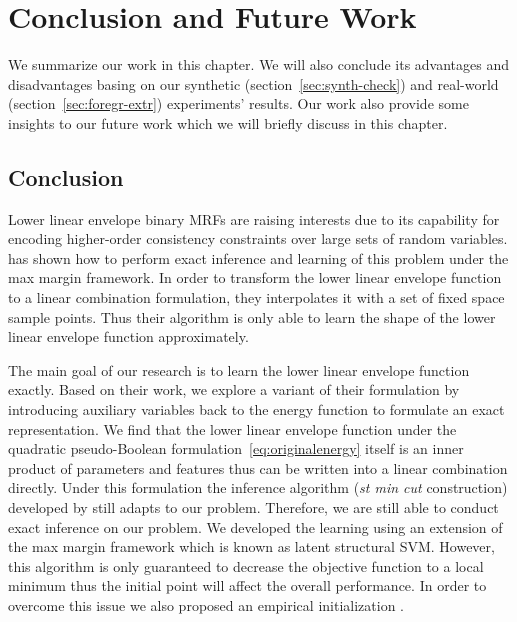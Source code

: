 
\chapter{Conclusion and Future Work}
\label{cha:conclusion}

We summarize our work in this chapter. We will also conclude its
advantages and disadvantages basing on our synthetic
(section~\ref{sec:synth-check}) and real-world
(section~\ref{sec:foregr-extr}) experiments' results. Our work
also provide some insights to our future work which we will
briefly discuss in this chapter.


\section{Conclusion}
\label{sec:conclusion}

Lower linear envelope binary MRFs are raising interests due to
its capability for encoding higher-order consistency constraints
over large sets of random variables.  has
shown how to perform exact inference and learning of this problem
under the max margin framework. In order to transform the lower
linear envelope function to a linear combination formulation,
they interpolates it with a set of fixed space sample points.
Thus their algorithm is only able to learn the shape of the lower
linear envelope function approximately.

The main goal of our research is to learn the lower linear
envelope function exactly. Based on their work, we explore a
variant of their formulation by introducing auxiliary variables
back to the energy function to formulate an exact representation.
We find that the lower linear envelope function under the
quadratic pseudo-Boolean formulation~\eqref{eq:originalenergy}
itself is an inner product of parameters and features thus can be
written into a linear combination directly. Under this
formulation the inference algorithm (\emph{st min cut}
construction) developed by  still adapts
to our problem. Therefore, we are still able to conduct exact
inference on our problem. We developed the learning
 using an extension of the max margin
framework which is known as latent structural SVM. However, this
algorithm is only guaranteed to decrease the objective function
to a local minimum thus the initial point will affect the overall
performance. In order to overcome this issue we also proposed an
empirical initialization .

